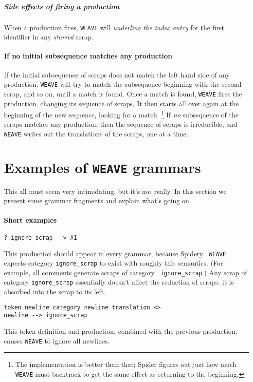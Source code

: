 \subparagraph{Side effects of firing a production}
When a production fires, {\tt WEAVE} will {\em underline the
index entry} for the first identifier in any {\em starred} scrap.

\paragraph{If no initial subsequence matches any production}
If the initial subsequence of scraps does not match the left hand side
of any production, {\tt WEAVE} will try to match the subsequence
beginning with the second scrap, and so on, until a match is found.
Once a match is found, {\tt WEAVE} fires the production, changing its
sequence of scraps.
It then starts all over again at the beginning of the new sequence,
looking for a match.%
\footnote{
The implementation is better than that; {Spider} figures out just
how much {\tt WEAVE} must backtrack to get the same effect as
returning to the beginning.}
If {\em no} subsequence of the scraps matches any production, then the
sequence of scraps is irreducible, and {\tt WEAVE} writes out the
translations of the scraps, one at a time.

\section{Examples of {\tt WEAVE} grammars}
This all must seem very intimidating, but it's not really.
In this section we present some grammar fragments and explain what's
going on.

\paragraph{Short examples}
\begin{verbatim} 
? ignore_scrap --> #1
\end{verbatim} 
This production should appear in  every grammar, because Spidery {\tt
WEAVE} expects category \verb+ignore_scrap+ to exist with roughly this
semantics. 
(For example, all comments generate scraps of category {\tt
ignore\_scrap}.) 
Any scrap of category \verb+ignore_scrap+ essentially doesn't affect
the reduction of scraps: it is absorbed into the scrap to its left.

\begin{verbatim}
token newline category newline translation <>
newline --> ignore_scrap
\end{verbatim}
This token definition and production, combined with the previous
production, causes {\tt WEAVE} to ignore all newlines.

